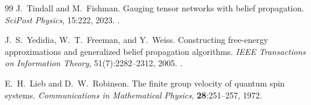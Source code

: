 \documentclass[11pt]{article}
\begin{document}
\begin{thebibliography}{99}
J.~Tindall and M.~Fishman.
\newblock Gauging tensor networks with belief propagation.
\newblock \emph{SciPost Physics}, 15:222, 2023.
\newblock {}.

J.~S.~Yedidia, W.~T.~Freeman, and Y.~Weiss.
\newblock Constructing free-energy approximations and generalized belief
 propagation algorithms.
\newblock \emph{IEEE Transactions on Information Theory}, 51(7):2282--2312,
 2005.
\newblock {}.

E.~H.~Lieb and D.~W.~Robinson.
\newblock The finite group velocity of quantum spin systems.
\newblock \emph{Communications in Mathematical Physics}, \textbf{28}:251--257,
 1972.

\end{thebibliography}

\appendix




\end{document}
